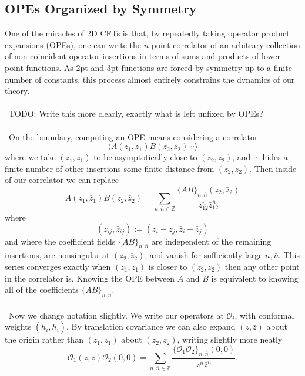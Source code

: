 \documentclass[11pt,letterpaper]{article}
\newcommand{\LP}{\left(}
\newcommand{\RP}{\right)}
\newcommand{\mc}[1]{\mathcal{#1}}
\newcommand{\Z}{\mathbb{Z}}
\begin{document}
\subsection{OPEs Organized by Symmetry}
One of the miracles of 2D CFTs is that, by repeatedly taking operator product expansions (OPEs), one can write the $n$-point correlator of an arbitrary collection of non-coincident operator insertions in terms of sums and products of lower-point functions. As 2pt and 3pt functions are forced by symmetry up to a finite number of constants, this process almost entirely constrains the dynamics of our theory.\\
\\
\
TODO: Write this more clearly, exactly what is left unfixed by OPEs?\\
\\
\
On the boundary, computing an OPE means considering a correlator \begin{equation}
\langle A (z_1, \bar{z}_1)
B (z_2, \bar{z}_2) \cdots \rangle
\end{equation}
where we take $(z_1, \bar{z}_1)$ to be asymptotically close to $(z_2, \bar{z}_2)$, and $\cdots$ hides a finite number of other insertions some finite distance from $(z_2, \bar{z}_2)$. Then inside of our correlator we can replace \begin{equation}
A (z_1, \bar{z}_1)
B (z_2, \bar{z}_2) = \sum_{n, \bar{n} \in \Z} \frac{\{AB\}_{n, \bar{n}}(z_2, \bar{z}_2)}{z_{12}^n \bar{z}_{12}^{\bar{n}}}
\end{equation}
where \begin{equation}
\LP z_{ij}, \bar{z}_{ij} \RP := \LP z_i - z_j, \bar{z}_i - \bar{z}_j \RP
\end{equation}
and where the coefficient fields $\{AB\}_{n, \bar{n}}$ are independent of the remaining insertions, are nonsingular at $(z_2, \bar{z}_2)$, and vanish for sufficiently large $n, \bar{n}$. This series converges exactly when $(z_1, \bar{z}_1)$ is closer to $(z_2, \bar{z}_2)$ then any other point in the correlator is. Knowing the OPE between $A$ and $B$ is equivalent to knowing all of the coefficients $\{AB\}_{n, \bar{n}}$.\\
\\
\
Now we change notation slightly. We write our operators at $\mc{O}_i$, with conformal weights $(h_i, \bar{h}_i)$. By translation covariance we can also expand $(z, \bar{z})$ about the origin rather than $(z_1, \bar{z}_1)$ about $(z_2, \bar{z}_2)$, writing slightly more neatly \begin{equation}
\mc{O}_1 (z, \bar{z})
\mc{O}_2 (0,0) = \sum_{n, \bar{n} \in \Z} \frac{\{\mc{O}_1 \mc{O}_2\}_{n, \bar{n}}(0,0)}{z^n \bar{z}^{\bar{n}}}.
\end{equation}
\end{document}
